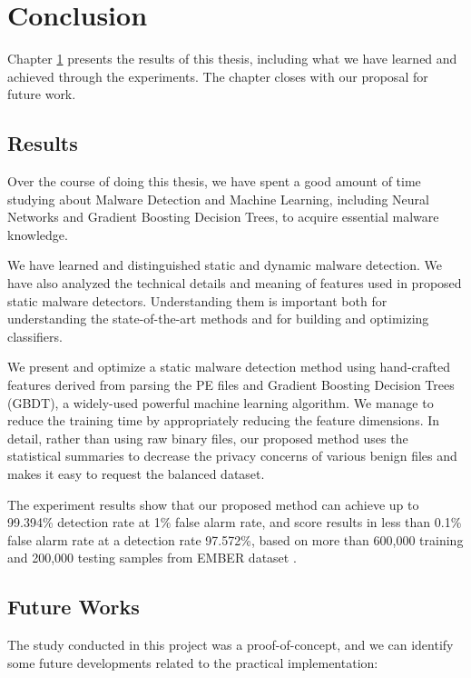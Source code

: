 \chapter{Conclusion} 
\label{chap:conclusion}

\begin{chapabstract}
Chapter \ref{chap:conclusion} presents the results of this thesis, including what we have learned and achieved through the experiments. The chapter closes with our proposal for future work.
\end{chapabstract}

\section{Results}

Over the course of doing this thesis, we have spent a good amount of time studying about Malware Detection and Machine Learning, including Neural Networks and Gradient Boosting Decision Trees, to acquire essential malware knowledge. 

We have learned and distinguished static and dynamic malware detection. We have also analyzed the technical details and meaning of features used in proposed static malware detectors. Understanding them is important both for understanding the state-of-the-art methods and for building and optimizing classifiers.

We present and optimize a static malware detection method using hand-crafted features derived from parsing the PE files and Gradient Boosting Decision Trees (GBDT), a widely-used powerful machine learning algorithm.
We manage to reduce the training time by appropriately reducing the feature dimensions. 
In detail, rather than using raw binary files, our proposed method uses the statistical summaries to decrease the privacy concerns of various benign files and makes it easy to request the balanced dataset. 

The experiment results show that our proposed method can achieve up to 99.394\% detection rate at 1\% false alarm rate, and score results in less than 0.1\% false alarm rate at a detection rate 97.572\%, based on more than 600,000 training and 200,000 testing samples from EMBER dataset \cite{anderson2018ember}.

\section{Future Works}

The study conducted in this project was a proof-of-concept, and we can identify some future developments related to the practical implementation:

